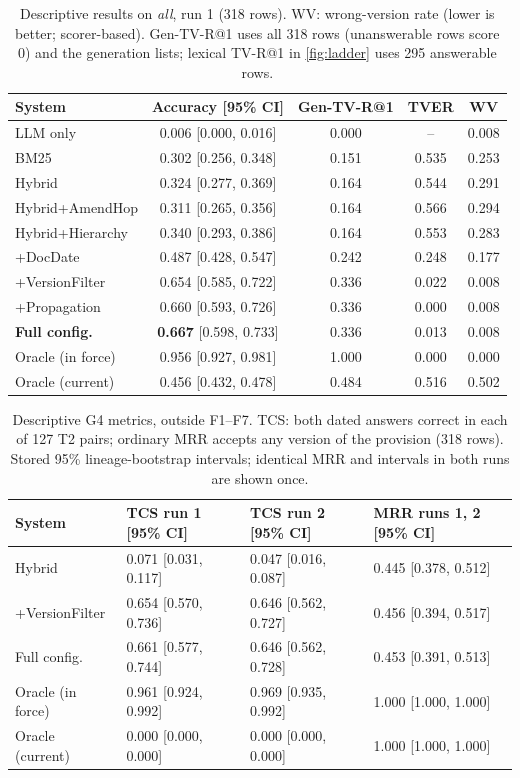 \documentclass[conference]{IEEEtran}
\begin{document}
\begin{table}[t]
\centering
\caption{Descriptive results on \textit{all}, run 1 (318 rows). WV: wrong-version rate (lower is better; scorer-based). Gen-TV-R@1 uses all 318 rows (unanswerable rows score 0) and the generation lists; lexical TV-R@1 in \cref{fig:ladder} uses 295 answerable rows.}
\label{tab:main}
\setlength{\tabcolsep}{3.5pt}
\footnotesize
\begin{tabular}{@{}l c c c c@{}}
\toprule
System & Accuracy [95\% CI] & Gen-TV-R@1 & TVER & WV \\
\midrule
LLM only & 0.006 [0.000, 0.016] & 0.000 & -- & 0.008 \\
BM25 & 0.302 [0.256, 0.348] & 0.151 & 0.535 & 0.253 \\
Hybrid & 0.324 [0.277, 0.369] & 0.164 & 0.544 & 0.291 \\
Hybrid+AmendHop & 0.311 [0.265, 0.356] & 0.164 & 0.566 & 0.294 \\
Hybrid+Hierarchy & 0.340 [0.293, 0.386] & 0.164 & 0.553 & 0.283 \\
+DocDate & 0.487 [0.428, 0.547] & 0.242 & 0.248 & 0.177 \\
+VersionFilter & 0.654 [0.585, 0.722] & 0.336 & 0.022 & 0.008 \\
+Propagation & 0.660 [0.593, 0.726] & 0.336 & 0.000 & 0.008 \\
\textbf{Full config.} & \textbf{0.667} [0.598, 0.733] & 0.336 & 0.013 & 0.008 \\
\midrule
Oracle (in force) & 0.956 [0.927, 0.981] & 1.000 & 0.000 & 0.000 \\
Oracle (current) & 0.456 [0.432, 0.478] & 0.484 & 0.516 & 0.502 \\
\bottomrule
\end{tabular}
\end{table}

\begin{table}[t]
\centering
\caption{Descriptive G4 metrics, outside F1--F7. TCS: both dated answers correct in each of 127 T2 pairs; ordinary MRR accepts any version of the provision (318 rows). Stored 95\% lineage-bootstrap intervals; identical MRR and intervals in both runs are shown once.}
\label{tab:tcs}
\setlength{\tabcolsep}{1.5pt}
\scriptsize
\begin{tabular}{@{}l l l l@{}}
\toprule
System & TCS run 1 [95\% CI] & TCS run 2 [95\% CI] & MRR runs 1, 2 [95\% CI] \\
\midrule
Hybrid & 0.071 [0.031, 0.117] & 0.047 [0.016, 0.087] & 0.445 [0.378, 0.512] \\
+VersionFilter & 0.654 [0.570, 0.736] & 0.646 [0.562, 0.727] & 0.456 [0.394, 0.517] \\
Full config. & 0.661 [0.577, 0.744] & 0.646 [0.562, 0.728] & 0.453 [0.391, 0.513] \\
Oracle (in force) & 0.961 [0.924, 0.992] & 0.969 [0.935, 0.992] & 1.000 [1.000, 1.000] \\
Oracle (current) & 0.000 [0.000, 0.000] & 0.000 [0.000, 0.000] & 1.000 [1.000, 1.000] \\
\bottomrule
\end{tabular}
\end{table}
\end{document}
